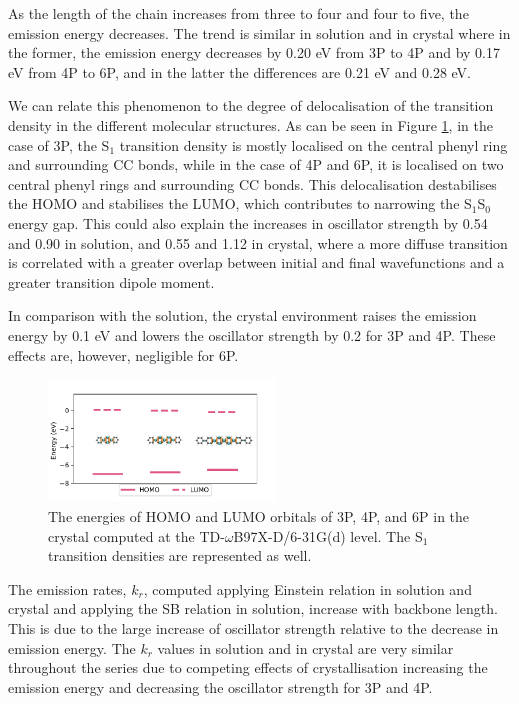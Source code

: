 As the length of the chain increases from three to four and four to five, the emission energy decreases. The trend is similar in solution and in crystal where in the former, the emission energy decreases by 0.20 eV from 3P to 4P and by 0.17 eV from 4P to 6P, and in the latter the differences are 0.21 eV and 0.28 eV.

We can relate this phenomenon to the degree of delocalisation of the transition density in the different molecular structures. As can be seen in Figure \ref{fig:nP_delocalisation}, in the case of 3P, the S$_1$ transition density is mostly localised on the central phenyl ring and surrounding C\textendash{}C bonds, while in the case of 4P and 6P, it is localised on two central phenyl rings and surrounding C\textendash{}C bonds. This delocalisation destabilises the HOMO and stabilises the LUMO, which contributes to narrowing the S$_1$\textendash{}S$_0$ energy gap. This could also explain the increases in oscillator strength by 0.54 and 0.90 in solution, and 0.55 and 1.12 in crystal, where a more diffuse transition is correlated with a greater overlap between initial and final wavefunctions and a greater transition dipole moment.

In comparison with the solution, the crystal environment raises the emission energy by 0.1 eV and lowers the oscillator strength by 0.2 for 3P and 4P. These effects are, however, negligible for 6P.

\begin{figure}
\centering
\includegraphics[width=6cm]{Chapters/7Applications/nP_delocalisation.pdf}
\caption{The energies of HOMO and LUMO orbitals of 3P, 4P, and 6P in the crystal computed at the TD-$\omega$B97X-D/6-31G(d) level. The S$_1$ transition densities are represented as well.}
\label{fig:nP_delocalisation}
\end{figure}


The emission rates, $k_r$, computed applying Einstein relation in solution and crystal and applying the SB relation in solution, increase with backbone length. This is due to the large increase of oscillator strength relative to the decrease in emission energy. The $k_r$ values in solution and in crystal are very similar throughout the series due to competing effects of crystallisation increasing the emission energy and decreasing the oscillator strength for 3P and 4P.

